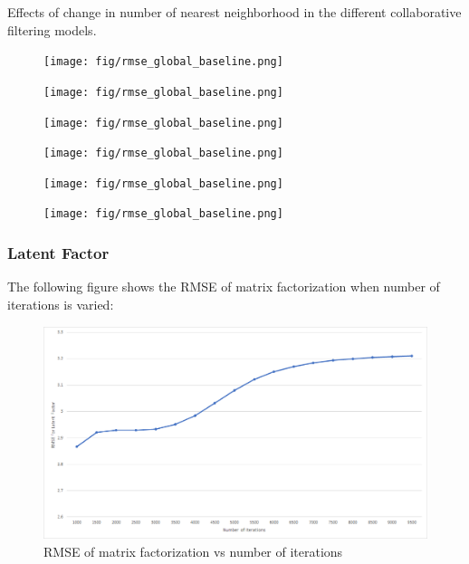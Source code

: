 Effects of change in number of nearest neighborhood in the different collaborative filtering models.
\begin{figure}[h]
  \centering
    \texttt{[image: fig/rmse\_global\_baseline.png]}
    \caption{}
\end{figure}

\begin{figure}[h]
  \centering
    \texttt{[image: fig/rmse\_global\_baseline.png]}
    \caption{}
\end{figure}

\begin{figure}[h]
  \centering
    \texttt{[image: fig/rmse\_global\_baseline.png]}
    \caption{}
\end{figure}

\begin{figure}[h]
  \centering
    \texttt{[image: fig/rmse\_global\_baseline.png]}
    \caption{}
\end{figure}

\begin{figure}[h]
  \centering
    \texttt{[image: fig/rmse\_global\_baseline.png]}
    \caption{}
\end{figure}

\begin{figure}[h]
  \centering
    \texttt{[image: fig/rmse\_global\_baseline.png]}
    \caption{}
\end{figure}


\subsubsection{Latent Factor}
The following figure shows the RMSE of matrix factorization when number of iterations is varied:

\cleardoublepage

\begin{figure}[!ht]
\centering
\includegraphics[width = \textwidth ]{fig/rmse_step.png}
\caption{RMSE of matrix factorization vs number of iterations}
\label{fig:rmse_step}
\end{figure}

